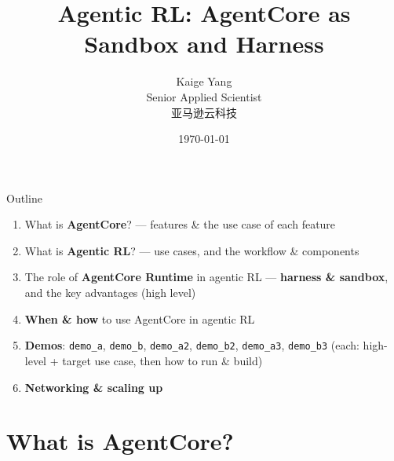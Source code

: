 \documentclass[aspectratio=169]{beamer}
\title[Agentic RL]{Agentic RL: AgentCore as Sandbox and Harness}
\author[Kaige Yang]{Kaige Yang \\ Senior Applied Scientist \\ 亚马逊云科技}
\date{\today}
\begin{document}
\begin{frame}
  \titlepage
\end{frame}

\begin{frame}{Outline}
  \small
  \begin{enumerate}\setlength\itemsep{0.35em}
    \item What is \textbf{AgentCore}? --- features \& the use case of each feature
    \item What is \textbf{Agentic RL}? --- use cases, and the workflow \& components
    \item The role of \textbf{AgentCore Runtime} in agentic RL --- \textbf{harness \& sandbox},
      and the key advantages (high level)
    \item \textbf{When \& how} to use AgentCore in agentic RL
    \item \textbf{Demos}: \texttt{demo\_a}, \texttt{demo\_b}, \texttt{demo\_a2},
      \texttt{demo\_b2}, \texttt{demo\_a3}, \texttt{demo\_b3}
      (each: high-level + target use case, then how to run \& build)
    \item \textbf{Networking \& scaling up}
  \end{enumerate}
\end{frame}



\section{What is AgentCore?}
\end{document}
